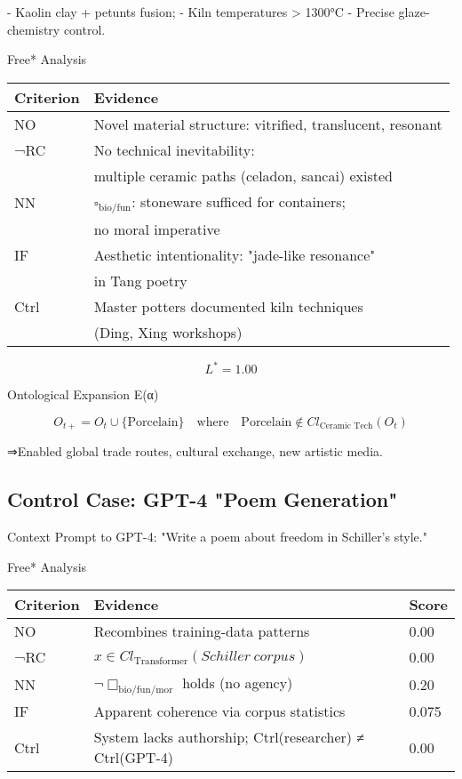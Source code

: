 \documentclass[11pt,a4paper]{article}
\begin{document}
- Kaolin clay + petunts fusion;
- Kiln temperatures > 1300°C
- Precise glaze-chemistry control.

Free* Analysis

\begin{tabular}{l l}
Criterion & Evidence \\
\hline
NO & Novel material structure: vitrified, translucent, resonant \cite[ p. 45]{kerr2024} \\
¬RC & No technical inevitability: 
\\ &multiple ceramic paths (celadon, sancai) existed \cite[ p. 112]{kerr2024} \\
NN & \(\square_{\text{bio/fun}}\): stoneware sufficed for containers; 
\\ & no moral imperative \cite[ p. 203]{kerr2024} \\
IF & Aesthetic intentionality: "jade-like resonance" 
\\ & in Tang poetry \cite[ p. 128]{paul2023} \\
Ctrl & Master potters documented kiln techniques 
\\ & (Ding, Xing workshops) \cite[ p. 78]{kerr2024} \\
\end{tabular}

\[
L^* = 1.00
\]

Ontological Expansion E(α)

\[
O_{t+} = O_t \cup\{\text{Porcelain}\} \quad \text{where} \quad \text{Porcelain} \notin Cl_{\text{Ceramic Tech}}(O_t)
\]

⇒Enabled global trade routes, cultural exchange, new artistic media.

\subsection{Control Case: GPT-4 "Poem Generation"}\label{sec:case-gpt4}

Context
Prompt to GPT-4: "Write a poem about freedom in Schiller's style."

Free* Analysis

\begin{tabular}{l l l}
Criterion & Evidence & Score \\
\hline
NO & Recombines training-data patterns \cite[ p. 80]{floridi2024} & 0.00 \\
¬RC & \(x \in Cl_{\text{Transformer}}(Schiller\ corpus)\) \cite[ p. 222]{greene2021} & 0.00 \\
NN & \(\neg\Box_{\text{bio/fun/mor}}\) holds (no agency) & 0.20 \\
IF & Apparent coherence via corpus statistics \cite[ p. 60]{coeckelbergh2023} & 0.075 \\
Ctrl & System lacks authorship; Ctrl(researcher) ≠ Ctrl(GPT-4) \cite[ p. 83]{floridi2024} & 0.00 \\
\end{tabular}
\end{document}
